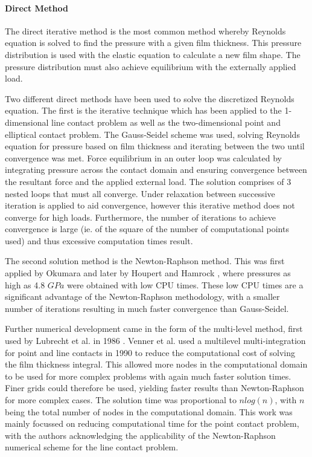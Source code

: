 \paragraph{Direct Method}

The direct iterative method is the most common method whereby Reynolds equation is solved to find the pressure with a given film thickness. This pressure distribution is used with the elastic equation to calculate a new film shape. The pressure distribution must also achieve equilibrium with the externally applied load.

Two different direct methods have been used to solve the discretized Reynolds equation. The first is the iterative technique which has been applied to the 1-dimensional line contact problem \cite{Hamrock1984} as well as the two-dimensional point \cite{Hamrock1976a} and elliptical \cite{Chittenden1985} contact problem. The Gauss-Seidel scheme was used, solving Reynolds equation for pressure based on film thickness and iterating between the two until convergence was met. Force equilibrium in an outer loop was calculated by integrating pressure across the contact domain and ensuring convergence between the resultant force and the applied external load. The solution comprises of 3 nested loops that must all converge. Under relaxation between successive iteration is applied to aid convergence, however this iterative method does not converge for high loads. Furthermore, the number of iterations to achieve convergence is large (ie. of the square of the number of computational points used) and thus excessive computation times result.

The second solution method is the Newton-Raphson method. This was first applied by Okumara \cite{Okumara1982} and later by Houpert and Hamrock \cite{Houpert1985}, where pressures as high as 4.8 $GPa$ were obtained with low CPU times. These low CPU times are a significant advantage of the Newton-Raphson methodology, with a smaller number of iterations resulting in much faster convergence than Gauss-Seidel.

Further numerical development came in the form of the multi-level method, first used by Lubrecht et al. in 1986 \cite{Lubrecht1986}. Venner et al. \cite{Venner1990} used a multilevel multi-integration for point and line contacts in 1990 to reduce the computational cost of solving the film thickness integral. This allowed more nodes in the computational domain to be used for more complex problems with again much faster solution times. Finer grids could therefore be used, yielding faster results than Newton-Raphson for more complex cases. The solution time was proportional to $n log(n)$, with $n$ being the total number of nodes in the computational domain. This work was mainly focussed on reducing computational time for the point contact problem, with the authors acknowledging the applicability of the Newton-Raphson numerical scheme for the line contact problem.

